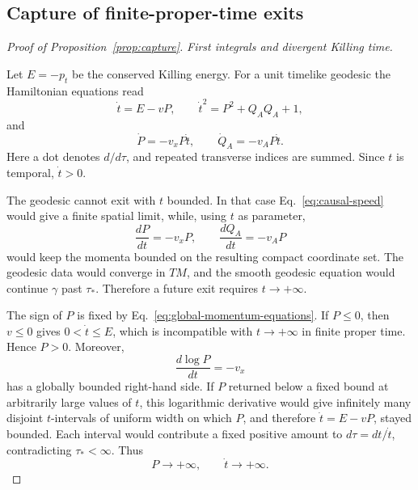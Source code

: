 \documentclass[10pt]{article}
\begin{document}
\subsection{Capture of finite-proper-time exits}

\begin{proof}[Proof of Proposition~\ref{prop:capture}]\mbox{}\par\smallskip
\noindent\emph{First integrals and divergent Killing time.}

Let \(E=-p_t\) be the conserved Killing energy.  For a unit timelike
geodesic the Hamiltonian equations read
\begin{equation}
  \dot t=E-vP,
  \qquad
  \dot t^2=P^2+Q_AQ_A+1,
  \label{eq:global-first-integrals}
\end{equation}
and
\begin{equation}
  \dot P=-v_xP\dot t,
  \qquad
  \dot Q_A=-v_AP\dot t .
  \label{eq:global-momentum-equations}
\end{equation}
Here a dot denotes \(d/d\tau\), and repeated transverse indices are summed.
Since \(t\) is temporal, \(\dot t>0\).

The geodesic cannot exit with \(t\) bounded.  In that case
Eq.~\eqref{eq:causal-speed} would give a finite spatial limit, while, using
\(t\) as parameter,
\begin{equation}
  \frac{dP}{dt}=-v_xP,
  \qquad
  \frac{dQ_A}{dt}=-v_AP
  \label{eq:t-momentum-equations}
\end{equation}
would keep the momenta bounded on the resulting compact coordinate set.  The
geodesic data would converge in \(TM\), and the smooth geodesic equation would
continue \(\gamma\) past \(\tau_*\).  Therefore a future exit requires
\(t\to+\infty\).

The sign of \(P\) is fixed by Eq.~\eqref{eq:global-momentum-equations}.  If
\(P\leq0\), then \(v\leq0\) gives \(0<\dot t\leq E\), which is incompatible
with \(t\to+\infty\) in finite proper time.  Hence \(P>0\).  Moreover,
\begin{equation}
  \frac{d\log P}{dt}=-v_x
  \label{eq:log-p}
\end{equation}
has a globally bounded right-hand side.  If \(P\) returned below a fixed bound
at arbitrarily large values of \(t\), this logarithmic derivative would give
infinitely many disjoint \(t\)-intervals of uniform width on which \(P\), and
therefore \(\dot t=E-vP\), stayed bounded.  Each interval would contribute a
fixed positive amount to \(d\tau=dt/\dot t\), contradicting
\(\tau_*<\infty\).  Thus
\begin{equation}
  P\longrightarrow+\infty,
  \qquad
  \dot t\longrightarrow+\infty .
  \label{eq:p-diverges}
\end{equation}


\end{proof}
\end{document}
